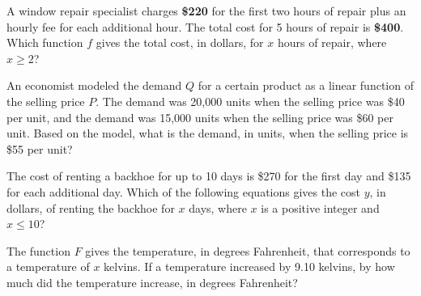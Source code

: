 \noindent\markforreview

\vspace{1em}

A window repair specialist charges \textbf{\$220} for the first two hours of repair plus an hourly fee for each additional hour. The total cost for 5 hours of repair is \textbf{\$400}. Which function \( f \) gives the total cost, in dollars, for \( x \) hours of repair, where \( x \geq 2 \)?

\vspace{0.75em}


\vspace{2em}
\noindent\markforreview

\vspace{1em}

An economist modeled the demand \( Q \) for a certain product as a linear function of the selling price \( P \). The demand was 20{,}000 units when the selling price was \$40 per unit, and the demand was 15{,}000 units when the selling price was \$60 per unit. Based on the model, what is the demand, in units, when the selling price is \$55 per unit?

\vspace{0.75em}


\newpage
\noindent\markforreview

\vspace{1em}

The cost of renting a backhoe for up to 10 days is \$270 for the first day and \$135 for each additional day. Which of the following equations gives the cost \( y \), in dollars, of renting the backhoe for \( x \) days, where \( x \) is a positive integer and \( x \leq 10 \)?

\vspace{0.75em}


\vspace{2em}
\noindent\markforreview

\vspace{1em}

The function \( F \) gives the temperature, in degrees Fahrenheit, that corresponds to a temperature of \( x \) kelvins. If a temperature increased by 9.10 kelvins, by how much did the temperature increase, in degrees Fahrenheit?

